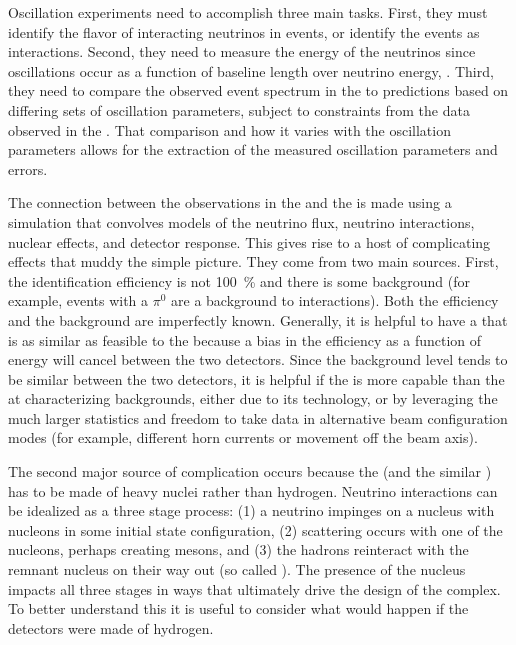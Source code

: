 Oscillation experiments need to accomplish three main tasks. First, they must identify the flavor of interacting neutrinos in  events, or identify the events as  interactions. Second, they need to measure the energy of the neutrinos since oscillations occur as a function of baseline length over neutrino energy, . Third, they need to compare the observed event spectrum in the  to  predictions based on differing sets of oscillation parameters, subject to constraints from the data observed in the .  That comparison and how it varies with the oscillation parameters allows for the extraction of the  measured oscillation parameters and errors.

The connection between the observations in the  and the  is made using a simulation that convolves models of the neutrino flux, neutrino interactions, nuclear effects, and detector response.
This gives rise to a host of complicating effects that 
muddy the simple picture. They come from two main sources. First, the identification efficiency is not \SI{100}{\%} and there is 
some background (for example,  events with a $\pi^0$ are a background to \nue {} interactions). Both the efficiency and the background are imperfectly known. Generally, it is helpful to have a   that is as similar as feasible to the   because a bias in the efficiency as a function of energy will cancel between the two detectors. Since the background level tends to be similar between the two detectors, it is helpful if the  is more capable than the  at characterizing backgrounds, either due to its technology, or by leveraging the much larger statistics and freedom to take data in alternative beam configuration modes (for example, different horn currents or movement off the beam axis). 

The second major source of complication occurs because the  (and the similar ) has to be made of heavy nuclei rather than hydrogen. Neutrino interactions can be idealized as a three stage process: (1) a neutrino impinges on a nucleus with nucleons in some initial state configuration, (2) scattering occurs with one of the nucleons, perhaps creating mesons, and (3) the hadrons reinteract with the remnant nucleus on their way out (so called ). The presence of the nucleus impacts all three stages in ways that ultimately drive the design of the   complex. To better understand this it is useful to consider what would happen if the detectors were made of hydrogen.

